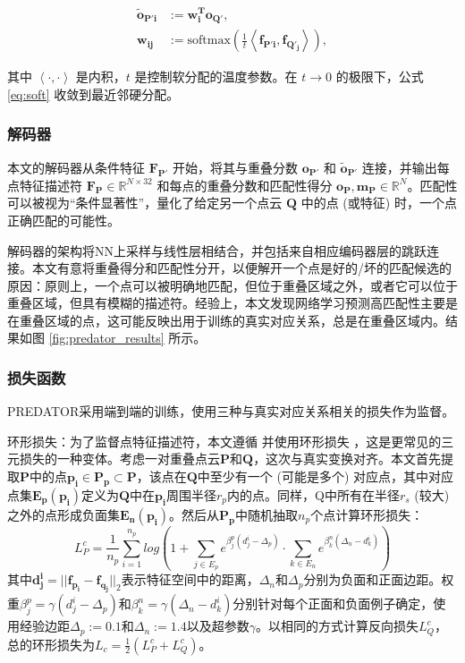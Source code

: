\begin{equation}
\begin{aligned}
    \label{eq:soft}
\boldsymbol{\tilde{o}_{P'i}} & := \boldsymbol{w_i^T o_{Q'}}, \\
\boldsymbol{w_{ij}} & := \text{softmax} \left( \frac{1}{t} \left<\boldsymbol{f_{P'i}}, \boldsymbol{f_{Q'_j}}\right> \right),
\end{aligned}
\end{equation}

其中 $\left<\cdot, \cdot\right>$ 是内积，$t$ 是控制软分配的温度参数。在 $t \rightarrow 0$ 的极限下，公式 \ref{eq:soft} 收敛到最近邻硬分配。

\subsubsection{解码器}
本文的解码器从条件特征 $\boldsymbol{F_{P'}}$ 开始，将其与重叠分数 $\boldsymbol{o_{P'}}$ 和 $\boldsymbol{\tilde{o}_{P'}}$ 连接，并输出每点特征描述符 $\boldsymbol{F_P} \in \mathbb{R}^{N \times 32}$ 和每点的重叠分数和匹配性得分 $\boldsymbol{o_P, m_P} \in \mathbb{R}^N$。匹配性可以被视为“条件显著性”，量化了给定另一个点云 $\boldsymbol{Q}$ 中的点 (或特征) 时，一个点正确匹配的可能性。

解码器的架构将NN上采样与线性层相结合，并包括来自相应编码器层的跳跃连接。本文有意将重叠得分和匹配性分开，以便解开一个点是好的/坏的匹配候选的原因：原则上，一个点可以被明确地匹配，但位于重叠区域之外，或者它可以位于重叠区域，但具有模糊的描述符。经验上，本文发现网络学习预测高匹配性主要是在重叠区域的点，这可能反映出用于训练的真实对应关系，总是在重叠区域内。结果如图 \ref{fig:predator_results} 所示。

\subsubsection{损失函数}
PREDATOR采用端到端的训练，使用三种与真实对应关系相关的损失作为监督。

环形损失：为了监督点特征描述符，本文遵循 \cite{bai2020d3feat} 并使用环形损失 \cite{sun2020circle} ，这是更常见的三元损失的一种变体。考虑一对重叠点云$\boldsymbol{P}$和$\boldsymbol{Q}$，这次与真实变换对齐。本文首先提取$\boldsymbol{P}$中的点$\boldsymbol{p_i} \in \boldsymbol{P_p} \subset \boldsymbol{P}$，该点在$\boldsymbol{Q}$中至少有一个 (可能是多个) 对应点，其中对应点集$\boldsymbol{E_p(p_i)}$定义为$\boldsymbol{Q}$中在$\boldsymbol{p_i}$周围半径$r_p$内的点。同样，Q中所有在半径$r_s$ (较大) 之外的点形成负面集$\boldsymbol{E_n(p_i)}$。然后从$\boldsymbol{P_p}$中随机抽取$n_p$个点计算环形损失：
\begin{equation}
L_P^c = \frac{1}{n_p} \sum_{i=1}^{n_p} log\left(1 + \sum_{j \in E_p} e^{\beta_j^p(d_j^i - \Delta_p)} \cdot \sum_{k \in E_n} e^{\beta_k^n(\Delta_n - d_k^i)}\right)
\end{equation}
其中$\boldsymbol{d_j^i} = ||\boldsymbol{f_{\boldsymbol{p_i}}} - \boldsymbol{f_{\boldsymbol{q_j}}}||_2$表示特征空间中的距离，$\Delta_n$和$\Delta_p$分别为负面和正面边距。权重$\beta_j^p = \gamma(d_j^i - \Delta_p)$和$\beta_k^n = \gamma(\Delta_n - d_k^i)$分别针对每个正面和负面例子确定，使用经验边距$\Delta_p := 0.1$和$\Delta_n := 1.4$以及超参数$\gamma$。以相同的方式计算反向损失$L_Q^c$，总的环形损失为$L_c = \frac{1}{2} (L_P^c + L_Q^c)$。

